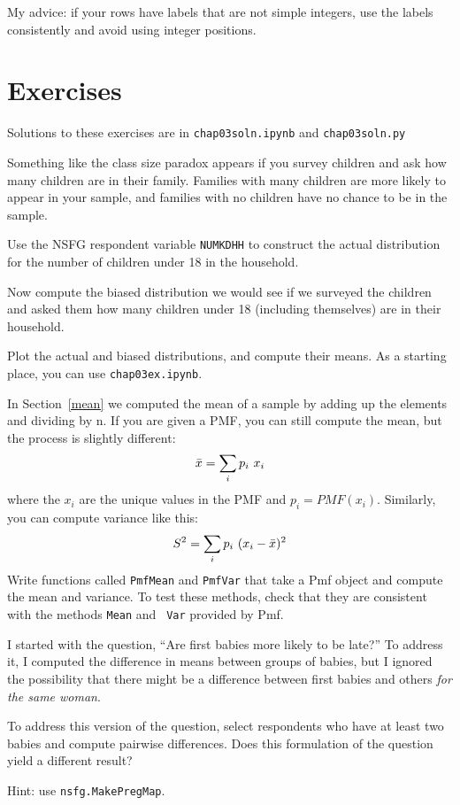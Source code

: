 \documentclass[12pt]{book}
\begin{document}
My advice: if your rows have labels that are not simple integers, use
the labels consistently and avoid using integer positions.



\section{Exercises}

Solutions to these exercises are in \verb"chap03soln.ipynb"
and \verb"chap03soln.py"

\begin{exercise}
Something like the class size paradox appears if you survey children
and ask how many children are in their family.  Families with many
children are more likely to appear in your sample, and
families with no children have no chance to be in the sample.

Use the NSFG respondent variable \verb"NUMKDHH" to construct the actual
distribution for the number of children under 18 in the household.

Now compute the biased distribution we would see if we surveyed the
children and asked them how many children under 18 (including themselves)
are in their household.  

Plot the actual and biased distributions, and compute their means.
As a starting place, you can use \verb"chap03ex.ipynb".
\end{exercise}


\begin{exercise}

In Section~\ref{mean} we computed the mean of a sample by adding up
the elements and dividing by n.  If you are given a PMF, you can
still compute the mean, but the process is slightly different:
%
\[ \bar{x} = \sum_i p_i~x_i \]
%
where the $x_i$ are the unique values in the PMF and $p_i=PMF(x_i)$.
Similarly, you can compute variance like this:
%
\[ S^2 = \sum_i p_i~(x_i - \bar{x})^2\]
% 
Write functions called {\tt PmfMean} and {\tt PmfVar} that take a
Pmf object and compute the mean and variance.  To test these methods,
check that they are consistent with the methods {\tt Mean} and {\tt
  Var} provided by Pmf.

\end{exercise}


\begin{exercise}
I started with the question, ``Are first babies more likely
to be late?''  To address it, I computed the difference in
means between groups of babies, but I ignored the possibility
that there might be a difference between first babies and
others {\em for the same woman}.

To address this version of the question, select respondents who
have at least two babies and compute pairwise differences.  Does
this formulation of the question yield a different result?

Hint: use {\tt nsfg.MakePregMap}.
\end{exercise}
\end{document}
